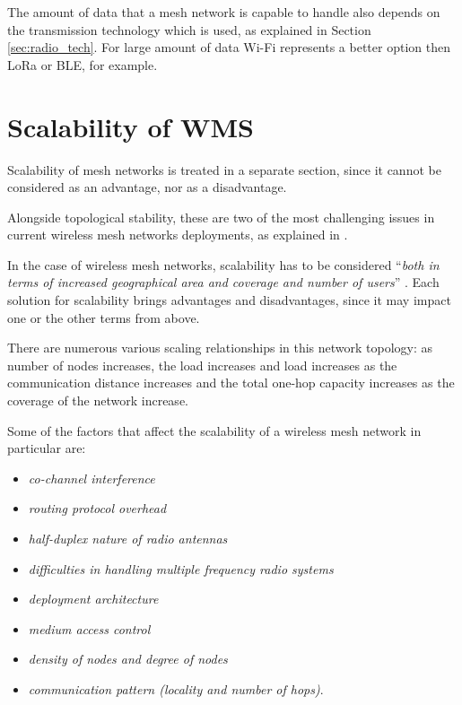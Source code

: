 			The amount of data that a mesh network is capable to handle also depends on the transmission technology which is used, as explained in Section \ref{sec:radio_tech}.
			For large amount of data Wi-Fi represents a better option then LoRa or BLE, for example.
		
	\section{Scalability of WMS}\label{sec:scalability}
			
			Scalability of mesh networks is treated in a separate section, since it cannot be considered as an advantage, nor as a disadvantage.
			
			Alongside topological stability, these are two of the most challenging issues in current wireless mesh networks deployments, as explained in \cite{Sampaio-2015}.
			
			In the case of wireless mesh networks, scalability has to be considered ``\textit{both in terms of increased geographical area and coverage and number of users}'' \cite{92000412}.
			Each solution for scalability brings advantages and disadvantages, since it may impact one or the other terms from above.
			
			There are numerous various scaling relationships in this network topology: as number of nodes increases, the load increases and load increases as the communication distance increases and the total one-hop capacity increases as the coverage of the network increase.
			
			Some of the factors that affect the scalability of a wireless mesh network in particular are:
			\begin{itemize}
				\item \textit{co-channel interference}
				\item \textit{routing protocol overhead}
				\item \textit{half-duplex nature of radio antennas}
				\item \textit{difficulties in handling multiple frequency radio systems}
				\item \textit{deployment architecture}
				\item \textit{medium access control}
				\item \textit{density of nodes and  degree of nodes}
				\item \textit{communication pattern (locality and number of hops)}.
			\end{itemize}			
			
